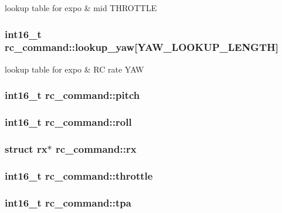 lookup table for expo \& mid T\+H\+R\+O\+T\+T\+L\+E 

\hypertarget{structrc__command_af60e0994175fb159769d8e9e84e05d99}{
\subsubsection[{lookup\+\_\+yaw}]{\setlength{\rightskip}{0pt plus 5cm}int16\+\_\+t rc\+\_\+command\+::lookup\+\_\+yaw\mbox{[}{\bf Y\+A\+W\+\_\+\+L\+O\+O\+K\+U\+P\+\_\+\+L\+E\+N\+G\+T\+H}\mbox{]}}}\label{structrc__command_af60e0994175fb159769d8e9e84e05d99}


lookup table for expo \& R\+C rate Y\+A\+W 

\hypertarget{structrc__command_a241a6c58c590a3d43c43e269fa8d9023}{
\subsubsection[{pitch}]{\setlength{\rightskip}{0pt plus 5cm}int16\+\_\+t rc\+\_\+command\+::pitch}}\label{structrc__command_a241a6c58c590a3d43c43e269fa8d9023}
\hypertarget{structrc__command_ac21b64ef2f07da324254c16d8928f50c}{
\subsubsection[{roll}]{\setlength{\rightskip}{0pt plus 5cm}int16\+\_\+t rc\+\_\+command\+::roll}}\label{structrc__command_ac21b64ef2f07da324254c16d8928f50c}
\hypertarget{structrc__command_ae4f73933858f00ea36e7d355e776aa6c}{
\subsubsection[{rx}]{\setlength{\rightskip}{0pt plus 5cm}struct {\bf rx}$\ast$ rc\+\_\+command\+::rx}}\label{structrc__command_ae4f73933858f00ea36e7d355e776aa6c}
\hypertarget{structrc__command_ac266979072e78c4e3d2919e661e76b30}{
\subsubsection[{throttle}]{\setlength{\rightskip}{0pt plus 5cm}int16\+\_\+t rc\+\_\+command\+::throttle}}\label{structrc__command_ac266979072e78c4e3d2919e661e76b30}
\hypertarget{structrc__command_a9ab8d4fed429491a21dd67b621eef9e7}{
\subsubsection[{tpa}]{\setlength{\rightskip}{0pt plus 5cm}int16\+\_\+t rc\+\_\+command\+::tpa}}\label{structrc__command_a9ab8d4fed429491a21dd67b621eef9e7}


